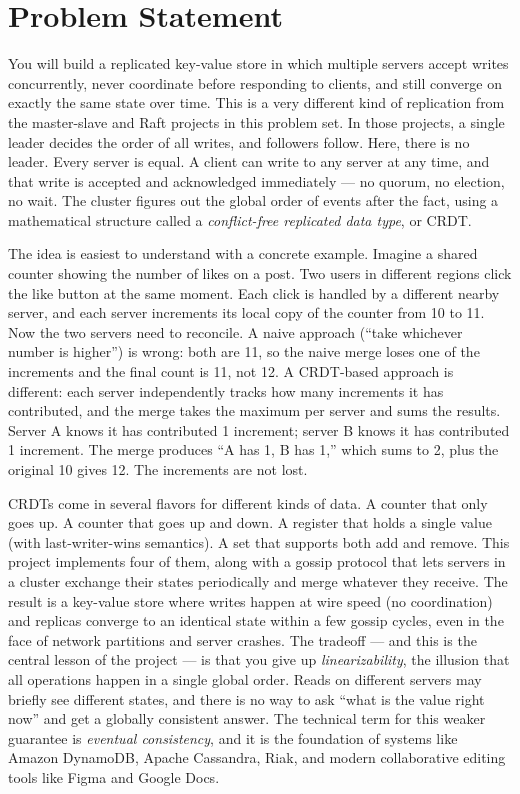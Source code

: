 \documentclass[11pt,a4paper]{article}
\begin{document}

\section{Problem Statement}

You will build a replicated key-value store in which multiple servers accept writes concurrently, never coordinate before responding to clients, and still converge on exactly the same state over time. This is a very different kind of replication from the master-slave and Raft projects in this problem set. In those projects, a single leader decides the order of all writes, and followers follow. Here, there is no leader. Every server is equal. A client can write to any server at any time, and that write is accepted and acknowledged immediately --- no quorum, no election, no wait. The cluster figures out the global order of events after the fact, using a mathematical structure called a \textit{conflict-free replicated data type}, or CRDT.

The idea is easiest to understand with a concrete example. Imagine a shared counter showing the number of likes on a post. Two users in different regions click the like button at the same moment. Each click is handled by a different nearby server, and each server increments its local copy of the counter from 10 to 11. Now the two servers need to reconcile. A naive approach (``take whichever number is higher'') is wrong: both are 11, so the naive merge loses one of the increments and the final count is 11, not 12. A CRDT-based approach is different: each server independently tracks how many increments it has contributed, and the merge takes the maximum per server and sums the results. Server A knows it has contributed 1 increment; server B knows it has contributed 1 increment. The merge produces ``A has 1, B has 1,'' which sums to 2, plus the original 10 gives 12. The increments are not lost.

CRDTs come in several flavors for different kinds of data. A counter that only goes up. A counter that goes up and down. A register that holds a single value (with last-writer-wins semantics). A set that supports both add and remove. This project implements four of them, along with a gossip protocol that lets servers in a cluster exchange their states periodically and merge whatever they receive. The result is a key-value store where writes happen at wire speed (no coordination) and replicas converge to an identical state within a few gossip cycles, even in the face of network partitions and server crashes. The tradeoff --- and this is the central lesson of the project --- is that you give up \textit{linearizability}, the illusion that all operations happen in a single global order. Reads on different servers may briefly see different states, and there is no way to ask ``what is the value right now'' and get a globally consistent answer. The technical term for this weaker guarantee is \textit{eventual consistency}, and it is the foundation of systems like Amazon DynamoDB, Apache Cassandra, Riak, and modern collaborative editing tools like Figma and Google Docs.
\end{document}
